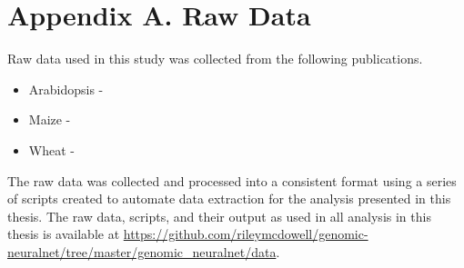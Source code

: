 \chapter*{Appendix A. Raw Data}

Raw data used in this study was collected from the following publications.

\begin{itemize}
\item Arabidopsis -  \citet{loudet2002}
\item Maize - \citet{crossa2010}
\item Wheat - \citet{thavamanikumar2015}
\end{itemize}

The raw data was collected and processed into a consistent format using a series 
of scripts created to automate data extraction for the analysis presented in
this thesis. The raw data, scripts, and their output as used in all analysis 
in this thesis is available at 
\url{https://github.com/rileymcdowell/genomic-neuralnet/tree/master/genomic\_neuralnet/data}.

